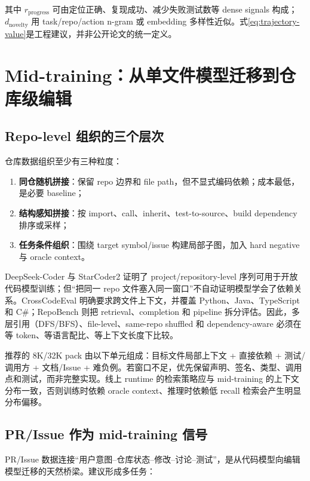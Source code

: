 \documentclass[10pt,a4paper,UTF8,fontset=none]{ctexart}
\begin{document}
其中 $r_{\mathrm{progress}}$ 可由定位正确、复现成功、减少失败测试数等 dense signals 构成；$d_{\mathrm{novelty}}$ 用 task/repo/action n-gram 或 embedding 多样性近似。式\eqref{eq:trajectory-value}是工程建议，并非公开论文的统一定义。

\section{Mid-training：从单文件模型迁移到仓库级编辑}

\subsection{Repo-level 组织的三个层次}

仓库数据组织至少有三种粒度：

\begin{enumerate}
  \item \textbf{同仓随机拼接}：保留 repo 边界和 file path，但不显式编码依赖；成本最低，是必要 baseline；
  \item \textbf{结构感知拼接}：按 import、call、inherit、test-to-source、build dependency 排序或采样；
  \item \textbf{任务条件组织}：围绕 target symbol/issue 构建局部子图，加入 hard negative 与 oracle context。
\end{enumerate}

DeepSeek-Coder 与 StarCoder2 证明了 project/repository-level 序列可用于开放代码模型训练\cite{guo2024deepseekcoder,lozhkov2024starcoder2}；但“把同一 repo 文件塞入同一窗口”不自动证明模型学会了依赖关系。CrossCodeEval 明确要求跨文件上下文，并覆盖 Python、Java、TypeScript 和 C\#\cite{ding2023crosscodeeval}；RepoBench 则把 retrieval、completion 和 pipeline 拆分评估\cite{liu2023repobench}。因此，多层引用（DFS/BFS）、file-level、same-repo shuffled 和 dependency-aware 必须在等 token、等语言配比、等上下文长度下比较。

推荐的 8K/32K pack 由以下单元组成：目标文件局部上下文 + 直接依赖 + 测试/调用方 + 文档/Issue + 难负例。若窗口不足，优先保留声明、签名、类型、调用点和测试，而非完整实现。线上 runtime 的检索策略应与 mid-training 的上下文分布一致，否则训练时依赖 oracle context、推理时依赖低 recall 检索会产生明显分布偏移。

\subsection{PR/Issue 作为 mid-training 信号}

PR/Issue 数据连接“用户意图--仓库状态--修改--讨论--测试”，是从代码模型向编辑模型迁移的天然桥梁。建议形成多任务：
\end{document}
